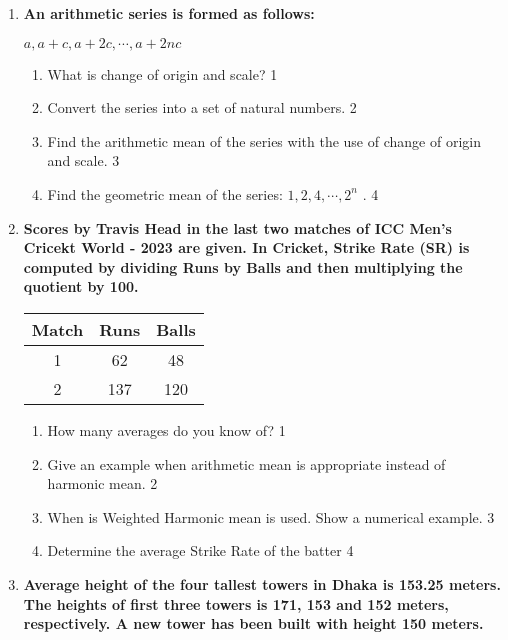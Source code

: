 \documentclass[a4paper,oneside]{book}
\begin{document}
\begin{enumerate}
 \item
	  \textbf{An arithmetic series is formed as follows:}
	  
	   \begin{center}
  \textbf{$a, a+c, a+2c, \cdots, a+2nc$}
  \end{center}
  
  \begin{enumerate}
    \item
	What is change of origin and scale? \hfill 1
    \item
	Convert the series into a set of natural numbers. \hfill 2
    \item  
	Find the arithmetic mean of the series with the use of change of origin and scale. \hfill 3
    \item
	Find the geometric mean of the series: $1, 2, 4, \cdots , 2^n$ . \hfill 4
  \end{enumerate}

 \item
	  \textbf{Scores by Travis Head in the last two matches of ICC Men's 
	  Cricekt World - 2023 are given. In Cricket, Strike Rate (SR) is computed by dividing Runs by Balls and then multiplying the quotient by 100.} 
	  
	  \begin{table}[h]
	  \centering
\begin{tabular}{c|c|c}
Match & Runs & Balls \\ \hline 
1 & 62 & 48 \\
2 & 137 & 120 \\ \hline 
\end{tabular}
\end{table}
  
  \begin{enumerate}
    \item
	How many averages do you know of? \hfill 1
    \item
	Give an example when arithmetic mean is appropriate instead of harmonic mean. \hfill 2
    \item  
	When is Weighted Harmonic mean is used. Show a numerical example. \hfill 3
    \item
	Determine the average Strike Rate of the batter \hfill 4
  \end{enumerate}
  
   \item
	  \textbf{Average height of the four tallest towers in Dhaka is 153.25 meters. The heights of first three towers is 171, 153 and 152 meters, respectively. A new tower has been built with height 150 meters.} 
  

\end{enumerate}
\end{document}
